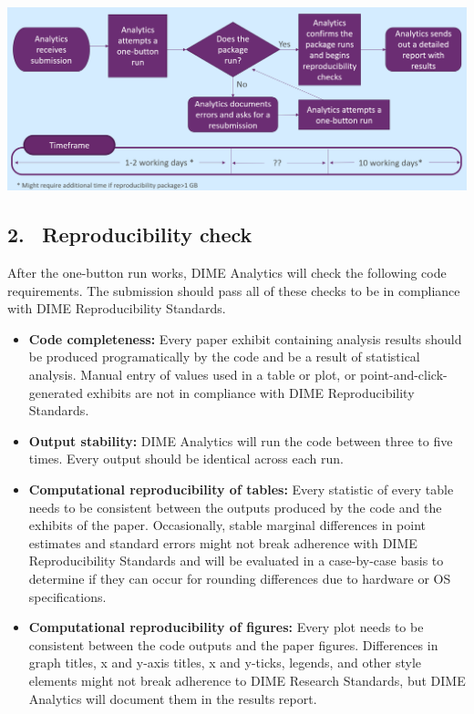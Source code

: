 \begin{fullwidth}
	\bigskip
	
	\begin{center}
		\includegraphics[width=0.9\linewidth]{../img/rep-checks-timeline.png}
	\end{center}

	\subsection{2. \, Reproducibility check}

	After the one-button run works, DIME Analytics will check the following code requirements. The submission should pass all of these checks to be in compliance with DIME Reproducibility Standards.

	\bigskip

	\begin{itemize}
		\setlength\itemsep{-0.1em}
		\item \textbf{Code completeness:} Every paper exhibit containing analysis results should be produced programatically by the code and be a result of statistical analysis. Manual entry of values used in a table or plot, or point-and-click-generated exhibits are not in compliance with DIME Reproducibility Standards.
		\item \textbf{Output stability:} DIME Analytics will run the code between three to five times. Every output should be  identical across each run.
		\item \textbf{Computational reproducibility of tables:} Every statistic of every table needs to be consistent between the outputs produced by the code and the exhibits of the paper. Occasionally, stable marginal differences in point estimates and standard errors might not break adherence with DIME Reproducibility Standards and will be evaluated in a case-by-case basis to determine if they can occur for rounding differences due to hardware or OS specifications.
		\item \textbf{Computational reproducibility of figures:} Every plot needs to be consistent between the code outputs and the paper figures. Differences in graph titles, x and y-axis titles, x and y-ticks, legends, and other style elements might not break adherence to DIME Research Standards, but DIME Analytics will document them in the results report.
	\end{itemize}


\end{fullwidth}
